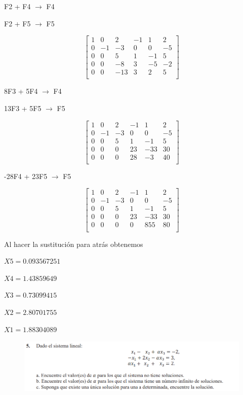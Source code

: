 \documentclass[12pt]{article}
\begin{document}
F2 + F4 $\longrightarrow $ F4

F2 + F5 $\longrightarrow $ F5

\[
\begin{bmatrix}
1 & 0 & 2 & -1 & 1 & 2\\ 
0 & -1 & -3 & 0 & 0 & -5\\
0 & 0 & 5 & 1 & -1 & 5\\   
0 & 0 & -8 & 3 & -5 & -2\\
0 & 0 & -13 & 3 & 2 & 5\\
\end{bmatrix}
\]

8F3 + 5F4 $\longrightarrow $ F4

13F3 + 5F5 $\longrightarrow $ F5

\[
\begin{bmatrix}
1 & 0 & 2 & -1 & 1 & 2\\ 
0 & -1 & -3 & 0 & 0 & -5\\
0 & 0 & 5 & 1 & -1 & 5\\   
0 & 0 & 0 & 23 & -33 & 30\\
0 & 0 & 0 & 28 & -3 & 40\\
\end{bmatrix}
\]

-28F4 + 23F5 $\longrightarrow $ F5

\[
\begin{bmatrix}
1 & 0 & 2 & -1 & 1 & 2\\ 
0 & -1 & -3 & 0 & 0 & -5\\
0 & 0 & 5 & 1 & -1 & 5\\   
0 & 0 & 0 & 23 & -33 & 30\\
0 & 0 & 0 & 0 & 855 & 80\\
\end{bmatrix}
\]

Al hacer la sustitución para atrás obtenemos

$X5 = 0.093567251$ 

$X4 = 1.43859649$ 

$X3 = 0.73099415$   

$X2 =2.80701755$  

$X1 =1.88304089$ 





\begin{figure}[H]
\includegraphics[width=1\textwidth]{./inFiles/Figures/Ej5.png}
\end{figure}
\end{document}
